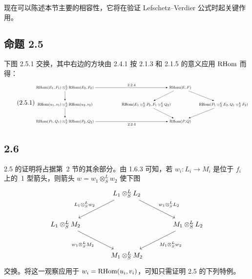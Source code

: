 现在可以陈述本节主要的相容性，它将在验证 Lefschetz--Verdier 公式时起关键作用。

\subsection*{命题 2.5}
下图 2.5.1 交换，其中右边的方块由 2.4.1 按 2.1.3 和 2.1.5 的意义应用 $\mathrm{RHom}$ 而得：
\begin{equation}\tag{2.5.1}
\resizebox{0.98\textwidth}{!}{%
\begin{tikzpicture}[>=latex,baseline=(current bounding box.center)]
\footnotesize
\node (A) at (0,2.6) {$\RHom(E_1,F_1)\otimes^L_S\RHom(E_2,F_2)$};
\node (B) at (0,1.3) {$\RHom(u_1,v_1)\otimes^L_S\RHom(u_2,v_2)$};
\node (C) at (0,0) {$\RHom(P_1,Q_1)\otimes^L_S\RHom(P_2,Q_2)$};
\node (D) at (8.8,2.6) {$\RHom(E,F)$};
\node (E) at (6.2,1.3) {$\RHom(E_1\otimes^L_SP_2,F_1\otimes^L_SQ_2)$};
\node (F) at (12.1,1.3) {$\RHom(P_1\otimes^L_SE_2,Q_1\otimes^L_SF_2)$};
\node (G) at (8.8,0) {$\RHom(P,Q)$};
\draw[->] (A) -- node[above] {$2.2.4$} (D);
\draw[->] (A) -- (B);
\draw[->] (B) -- (C);
\draw[->] (C) -- node[below] {$2.2.4$} (G);
\draw[->] (D) -- (E);
\draw[->] (D) -- (F);
\draw[->] (E) -- (G);
\draw[->] (F) -- (G);
\end{tikzpicture}}
\end{equation}

\subsection*{2.6}
2.5 的证明将占据第~2 节的其余部分。由 1.6.3 可知，若 $w_i:L_i\to M_i$ 是位于 $f_i$ 上的~1 型箭头，则箭头 $w=w_1\otimes^{L}_{S}w_2$ 使下图
\[
\begin{tikzcd}[column sep=large,row sep=large]
& L_1\otimes^L_S L_2 \arrow[dl,"{L_1\otimes^L_S w_2}"'] \arrow[dr,"{w_1\otimes^L_S L_2}"] & \\
L_1\otimes^L_S M_2 \arrow[dr,"{w_1\otimes^L_S M_2}"'] & & M_1\otimes^L_S L_2 \arrow[dl,"{M_1\otimes^L_S w_2}"]\\
& M_1\otimes^L_S M_2 &
\end{tikzcd}
\]
交换。将这一观察应用于 $w_i=\mathrm{RHom}(u_i,v_i)$，可知只需证明 2.5 的下列特例。

